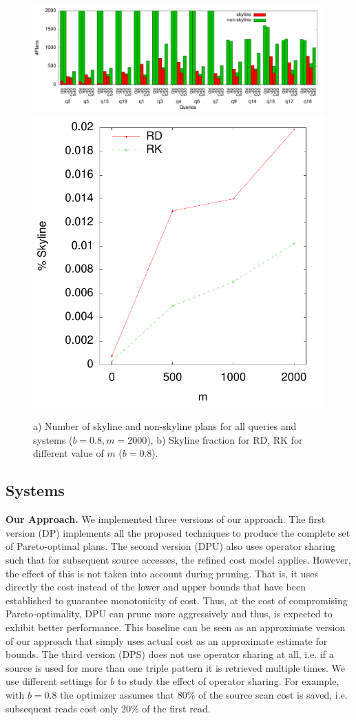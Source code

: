 \begin{figure}[htb]
  \vspace{-0.5cm}
  \centering
  \includegraphics[width=0.75\linewidth]{figs/all_queries.pdf}
  \includegraphics[width=0.24\linewidth]{figs/plans_skyline_by_m.pdf}
  \caption{a) Number of skyline and non-skyline plans for all queries
    and systems ($b=0.8, m=2000$), b) Skyline fraction for RD, RK for
    different value of $m$ ($b=0.8$).}
  \label{fig:queries}
  \vspace{-0.5cm}
\end{figure}

\subsection{Systems}
\textbf{Our Approach.} We implemented three versions of our
approach. The first version (DP) implements all the proposed
techniques to produce the complete set of Pareto-optimal plans. The
second version (DPU) also uses operator sharing such that for
subsequent source accesses, the refined cost model applies. However,
the effect of this is not taken into account during pruning.  That is,
it uses directly the cost instead of the lower and upper bounds that
have been established to guarantee monotonicity of cost. Thus, at the
cost of compromising Pareto-optimality, DPU can prune more
aggressively and thus, is expected to exhibit better performance. This baseline can be seen as an approximate version of our approach that simply uses actual cost as an approximate estimate for bounds. 
The third version (DPS) does not use
operator sharing at all, i.e. if a source is used for more than one
triple pattern it is retrieved multiple times. 
We use different settings for $b$ to study the effect of operator sharing. For example, with $b=0.8$ the optimizer assumes that 80\% of
the source scan cost is saved, i.e. subsequent reads cost only 20\% of the first read.

